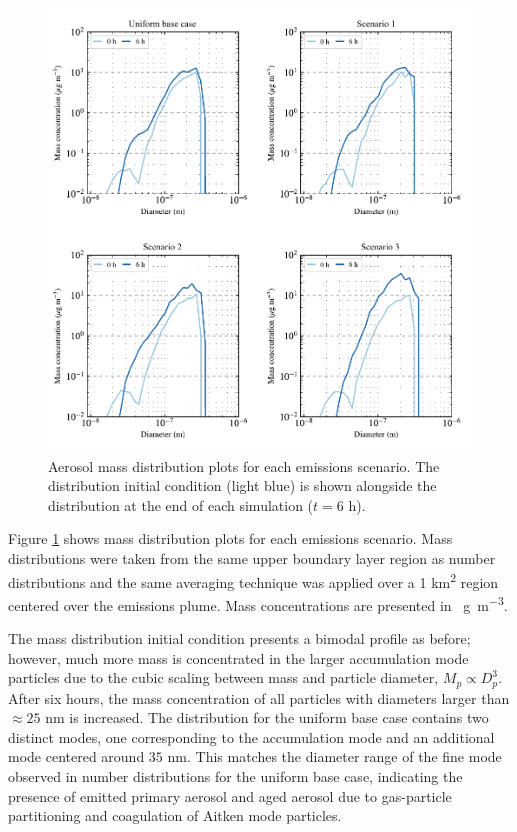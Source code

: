 \begin{figure}[!t]
  \centering
    \includegraphics[width=\textwidth]{figures/chapter5/mass-distribution-plots.pdf}
    \caption{Aerosol mass distribution plots for each emissions scenario. The distribution initial condition (light blue) is shown alongside the distribution at the end of each simulation ($t=6$ h).}
    \label{fig:mass-dists}
\end{figure}

Figure \ref{fig:mass-dists} shows mass distribution plots for each emissions scenario. Mass distributions were taken from the same upper boundary layer region as number distributions and the same averaging technique was applied over a 1 \si{km^2} region centered over the emissions plume. Mass concentrations are presented in \si{\mu g.m^{-3}}. 

The mass distribution initial condition presents a bimodal profile as before; however, much more mass is concentrated in the larger accumulation mode particles due to the cubic scaling between mass and particle diameter, $M_p \propto D_p^3$. After six hours, the mass concentration of all particles with diameters larger than $\approx25$ nm is increased. The distribution for the uniform base case contains two distinct modes, one corresponding to the accumulation mode and an additional mode centered around $35$ nm. This matches the diameter range of the fine mode observed in number distributions for the uniform base case, indicating the presence of emitted primary aerosol and aged aerosol due to gas-particle partitioning and coagulation of Aitken mode particles. 

